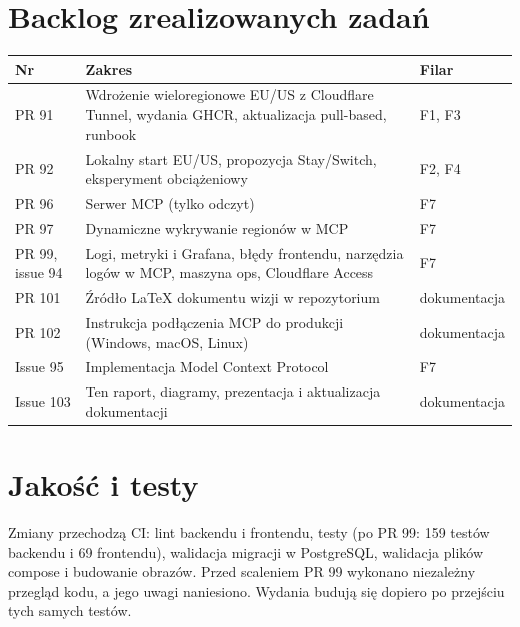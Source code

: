 \documentclass[12pt,a4paper]{article}
\begin{document}
\section{Backlog zrealizowanych zadań}
\begin{table}[H]
\centering\footnotesize
\begin{tabularx}{\textwidth}{@{}lYl@{}}
\toprule
\textbf{Nr} & \textbf{Zakres} & \textbf{Filar} \\
\midrule
PR 91 & Wdrożenie wieloregionowe EU/US z Cloudflare Tunnel, wydania GHCR, aktualizacja pull-based, runbook & F1, F3 \\
PR 92 & Lokalny start EU/US, propozycja Stay/Switch, eksperyment obciążeniowy & F2, F4 \\
PR 96 & Serwer MCP (tylko odczyt) & F7 \\
PR 97 & Dynamiczne wykrywanie regionów w MCP & F7 \\
PR 99, issue 94 & Logi, metryki i Grafana, błędy frontendu, narzędzia logów w MCP, maszyna ops, Cloudflare Access & F7 \\
PR 101 & Źródło LaTeX dokumentu wizji w repozytorium & dokumentacja \\
PR 102 & Instrukcja podłączenia MCP do produkcji (Windows, macOS, Linux) & dokumentacja \\
Issue 95 & Implementacja Model Context Protocol & F7 \\
Issue 103 & Ten raport, diagramy, prezentacja i aktualizacja dokumentacji & dokumentacja \\
\bottomrule
\end{tabularx}
\end{table}

\section{Jakość i testy}
Zmiany przechodzą CI: lint backendu i frontendu, testy (po PR 99: 159 testów backendu i 69 frontendu),
walidacja migracji w PostgreSQL, walidacja plików compose i budowanie obrazów. Przed scaleniem PR 99 wykonano
niezależny przegląd kodu, a jego uwagi naniesiono. Wydania budują się dopiero po przejściu tych samych testów.

\end{document}
